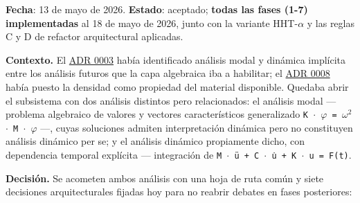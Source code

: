 \documentclass[11pt,oneside]{report}
\begin{document}
\textbf{Fecha}: 13 de mayo de 2026. \textbf{Estado}: aceptado; \textbf{todas las fases (1-7) implementadas} al 18 de mayo de 2026, junto con la variante HHT-\ensuremath{\alpha} y las reglas C y D de refactor arquitectural aplicadas.

\textbf{Contexto.} El \hyperref[adr:0003]{ADR 0003} había identificado análisis modal y dinámica implícita entre los análisis futuros que la capa algebraica iba a habilitar; el \hyperref[adr:0008]{ADR 0008} había puesto la densidad como propiedad del material disponible. Quedaba abrir el subsistema con dos análisis distintos pero relacionados: el análisis modal --- problema algebraico de valores y vectores característicos generalizado \texttt{K \ensuremath{\cdot} \ensuremath{\varphi} = \ensuremath{\omega}\ensuremath{^{2}} \ensuremath{\cdot} M \ensuremath{\cdot} \ensuremath{\varphi}} ---, cuyas soluciones admiten interpretación dinámica pero no constituyen análisis dinámico per se; y el análisis dinámico propiamente dicho, con dependencia temporal explícita --- integración de \texttt{M \ensuremath{\cdot} ü + C \ensuremath{\cdot} u̇ + K \ensuremath{\cdot} u = F(t)}.

\textbf{Decisión.} Se acometen ambos análisis con una hoja de ruta común y siete decisiones arquitecturales fijadas hoy para no reabrir debates en fases posteriores:
\end{document}
